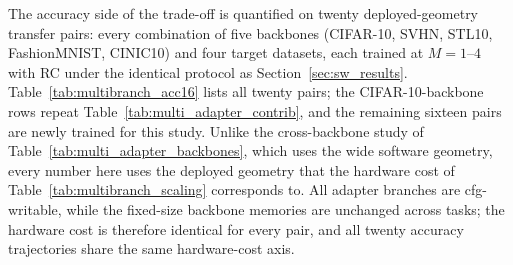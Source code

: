 \documentclass[12pt, a4paper]{report}
\numberwithin{equation}{chapter}
\numberwithin{figure}{chapter}
\numberwithin{table}{chapter}
\numberwithin{algorithm}{chapter}
\begin{document}
The accuracy side of the trade-off is quantified on twenty deployed-geometry transfer pairs: every combination of five backbones (CIFAR-10, SVHN, STL10, FashionMNIST, CINIC10) and four target datasets, each trained at $M{=}1$--$4$ with RC under the identical protocol as Section~\ref{sec:sw_results}. Table~\ref{tab:multibranch_acc16} lists all twenty pairs; the CIFAR-10-backbone rows repeat Table~\ref{tab:multi_adapter_contrib}, and the remaining sixteen pairs are newly trained for this study. Unlike the cross-backbone study of Table~\ref{tab:multi_adapter_backbones}, which uses the wide software geometry, every number here uses the deployed geometry that the hardware cost of Table~\ref{tab:multibranch_scaling} corresponds to. All adapter branches are cfg-writable, while the fixed-size backbone memories are unchanged across tasks; the hardware cost is therefore identical for every pair, and all twenty accuracy trajectories share the same hardware-cost axis.
\end{document}
